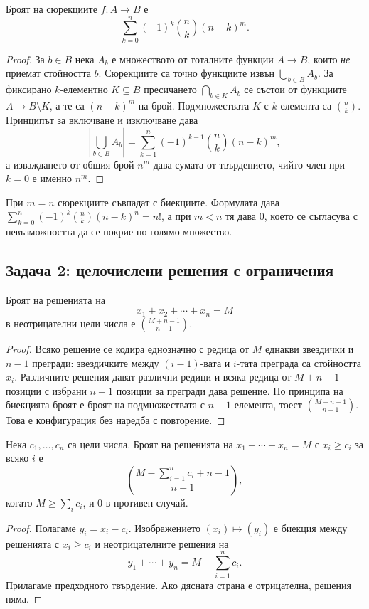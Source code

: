 \begin{prop}[Сюрекции]
Броят на сюрекциите $f:A\to B$ е
\[
\sum_{k=0}^{n}(-1)^k\binom{n}{k}(n-k)^m .
\]
\end{prop}
\begin{proof}
За $b\in B$ нека $A_b$ е множеството от тоталните функции $A\to B$, които
\emph{не} приемат стойността $b$. Сюрекциите са точно функциите извън
$\bigcup_{b\in B}A_b$. За фиксирано $k$-елементно $K\subseteq B$ пресичането
$\bigcap_{b\in K}A_b$ се състои от функциите $A\to B\setminus K$, а те са
$(n-k)^m$ на брой. Подмножествата $K$ с $k$ елемента са $\binom{n}{k}$.
Принципът за включване и изключване дава
\[
\left|\bigcup_{b\in B}A_b\right|=\sum_{k=1}^{n}(-1)^{k-1}\binom{n}{k}(n-k)^m,
\]
а изваждането от общия брой $n^m$ дава сумата от твърдението, чийто член при
$k=0$ е именно $n^m$.
\end{proof}

\begin{example}
При $m=n$ сюрекциите съвпадат с биекциите. Формулата дава
$\sum_{k=0}^{n}(-1)^k\binom{n}{k}(n-k)^n=n!$, а при $m<n$ тя дава $0$, което се
съгласува с невъзможността да се покрие по-голямо множество.
\end{example}

\subsection{Задача 2: целочислени решения с ограничения}\label{s:2.5.2}

\begin{prop}
Броят на решенията на
\[
x_1+x_2+\cdots+x_n=M
\]
в неотрицателни цели числа е $\binom{M+n-1}{n-1}$.
\end{prop}
\begin{proof}
Всяко решение се кодира еднозначно с редица от $M$ еднакви звездички и $n-1$
прегради: звездичките между $(i-1)$-вата и $i$-тата преграда са стойността
$x_i$. Различните решения дават различни редици и всяка редица от $M+n-1$
позиции с избрани $n-1$ позиции за прегради дава решение. По принципа на
биекцията броят е броят на подмножествата с $n-1$ елемента, тоест
$\binom{M+n-1}{n-1}$. Това е конфигурация без наредба с повторение.
\end{proof}

\begin{prop}
Нека $c_1,\ldots,c_n$ са цели числа. Броят на решенията на
$x_1+\cdots+x_n=M$ с $x_i\geq c_i$ за всяко $i$ е
\[
\binom{M-\sum_{i=1}^{n}c_i+n-1}{n-1},
\]
когато $M\geq\sum_i c_i$, и $0$ в противен случай.
\end{prop}
\begin{proof}
Полагаме $y_i=x_i-c_i$. Изображението $(x_i)\mapsto(y_i)$ е биекция между
решенията с $x_i\geq c_i$ и неотрицателните решения на
\[
y_1+\cdots+y_n=M-\sum_{i=1}^{n}c_i .
\]
Прилагаме предходното твърдение. Ако дясната страна е отрицателна, решения няма.
\end{proof}

